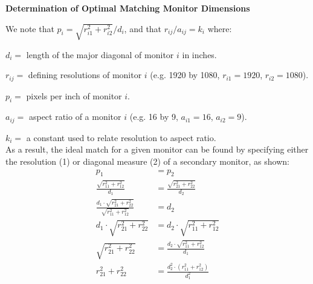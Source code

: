 \documentclass[12pt,letterpaper]{amsart}
\begin{document}
  \begin{center}
    \textbf{\large Determination of Optimal Matching Monitor Dimensions}

    \smallskip

  \end{center}
  
  \noindent We note that $p_i = \sqrt{r_{i1}^2 + r_{i2}^2}/d_i$, and that $r_{ij}/a_{ij} = k_i$ where:
  
  $d_i=$ length of the major diagonal of monitor $i$ in inches.
  
  $r_{ij}=$ defining resolutions of monitor $i$ (e.g. 1920 by 1080, $r_{i1}=1920$, $r_{i2}=1080$).
  
  $p_i=$ pixels per inch of monitor $i$.
  
  $a_{ij}=$ aspect ratio of a monitor $i$ (e.g. 16 by 9, $a_{i1}=16$, $a_{i2}=9$).
  
  $k_i=$ a constant used to relate resolution to aspect ratio.\\
  
  \noindent As a result, the ideal match for a given monitor can be found by specifying either the resolution (1) or diagonal measure (2) of a secondary monitor, as shown:
  \begin{align}
    p_1 &= p_2 \nonumber \\
    \frac{\sqrt{r_{11}^2 + r_{12}^2}}{d_1} &= \frac{\sqrt{r_{21}^2 + r_{22}^2}}{d_2} \nonumber \\
    \frac{d_1\cdot\sqrt{r_{21}^2 + r_{22}^2}}{\sqrt{r_{11}^2 + r_{12}^2}} &= d_2\\
    d_1\cdot\sqrt{r_{21}^2 + r_{22}^2} &= d_2\cdot\sqrt{r_{11}^2 + r_{12}^2} \nonumber \\
    \sqrt{r_{21}^2 + r_{22}^2} &= \frac{d_2\cdot\sqrt{r_{11}^2 + r_{12}^2}}{d_1} \nonumber \\
    r_{21}^2 + r_{22}^2 &= \frac{d_2^2\cdot(r_{11}^2 + r_{12}^2)}{d_1^2}
  \end{align}
  
\end{document}
